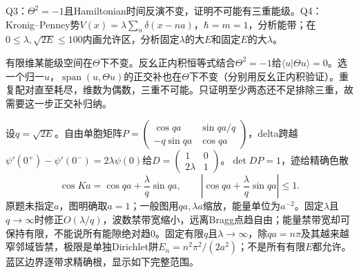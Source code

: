 \begin{exercise}
Q3：$\Theta^2=-1$且Hamiltonian时间反演不变，证明不可能有三重能级。Q4：Kronig--Penney势$V(x)=\lambda\sum_n\delta(x-na)$，$\hbar=m=1$，分析能带；在$0\le\lambda,\sqrt{2E}\le100$内画允许区，分析固定$\lambda$的大$E$和固定$E$的大$\lambda$。
\end{exercise}
\begin{solution}
有限维某能级空间在$\Theta$下不变。反幺正内积恒等式结合$\Theta^2=-1$给$\langle u|\Theta u\rangle=0$。选一个归一$u$，$\operatorname{span}(u,\Theta u)$的正交补也在$\Theta$下不变（分别用反幺正内积验证）。重复配对直至耗尽，维数为偶数，三重不可能。只证明至少两态还不足排除三重，故需要这一步正交补归纳。

设$q=\sqrt{2E}$。自由单胞矩阵$P=\left(\begin{smallmatrix}\cos qa&\sin qa/q\\-q\sin qa&\cos qa\end{smallmatrix}\right)$，delta跨越$\psi'(0^+)-\psi'(0^-)=2\lambda\psi(0)$给$D=\left(\begin{smallmatrix}1&0\\2\lambda&1\end{smallmatrix}\right)$。$\det DP=1$，迹给精确色散
\[
 \cos Ka=\cos qa+\frac\lambda q\sin qa,\qquad
 \left|\cos qa+\frac\lambda q\sin qa\right|\le1.
\]
原题未指定$a$，图明确取$a=1$；一般图用$qa,\lambda a$缩放，能量单位为$a^{-2}$。固定$\lambda$且$q\to\infty$时修正$O(\lambda/q)$，波数禁带宽缩小，远离Bragg点趋自由；能量禁带宽却可保持有限，不能说所有能隙绝对趋0。固定有限$q$且$\lambda\to\infty$，除$qa=n\pi$及其越来越窄邻域皆禁，极限是单独Dirichlet阱$E_n=n^2\pi^2/(2a^2)$；不是所有有限$E$都允许。蓝区边界逐带求精确根，显示如下完整范围。

\end{solution}

